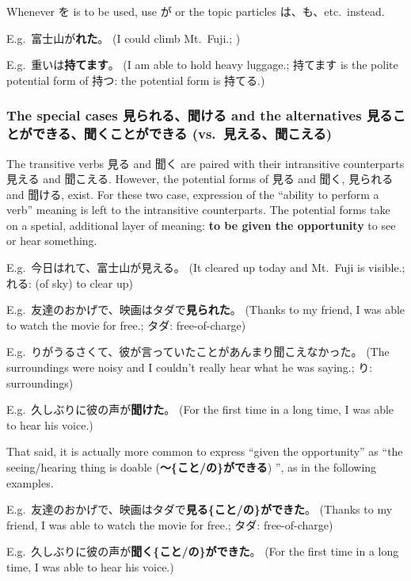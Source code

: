 \documentclass[../nihongo-gakushuu-kyouzai.tex]{subfiles}
\begin{document}
 Whenever を is to be used, use が or the topic particles は、も、etc.\ instead.

E.g.\ 富士山が\textbf{れた}。 (I could climb Mt.~Fuji.; )

E.g.\ 重いは\textbf{持てます}。 (I am able to hold heavy luggage.; 持てます is the polite potential form of 持つ: the potential form is 持てる.)

\subsubsection{The special cases 見られる、聞ける and the alternatives 見ることができる、聞くことができる (vs.\ 見える、聞こえる)} \label{sec:special-cases-mirareru-kikeru}
The transitive verbs 見る and 聞く are paired with their intransitive counterparts 見える and 聞こえる. However, the potential forms of 見る and 聞く, 見られる and 聞ける, exist. For these two case, expression of the ``ability to perform a verb'' meaning is left to the intransitive counterparts. The potential forms take on a spetial, additional layer of meaning: \textbf{to be given the opportunity} to see or hear something.

E.g.\ 今日はれて、富士山が見える。 (It cleared up today and Mt.~Fuji is visible.; れる: (of sky) to clear up)

E.g.\ 友達のおかげで、映画はタダで\textbf{見られた}。 (Thanks to my friend, I was able to watch the movie for free.; タダ: free-of-charge)

E.g.\ りがうるさくて、彼が言っていたことがあんまり聞こえなかった。 (The surroundings were noisy and I couldn't really hear what he was saying.; り: surroundings)

E.g.\ 久しぶりに彼の声が\textbf{聞けた}。 (For the first time in a long time, I was able to hear his voice.)


That said, it is actually more common to express ``given the opportunity'' as ``the seeing/hearing thing is doable (\textbf{〜\{こと/の\}ができる}) '', as in the following examples.

E.g.\ 友達のおかげで、映画はタダで\textbf{見る\{こと/の\}ができた}。 (Thanks to my friend, I was able to watch the movie for free.; タダ: free-of-charge)

E.g.\ 久しぶりに彼の声が\textbf{聞く\{こと/の\}ができた}。 (For the first time in a long time, I was able to hear his voice.)
\end{document}
